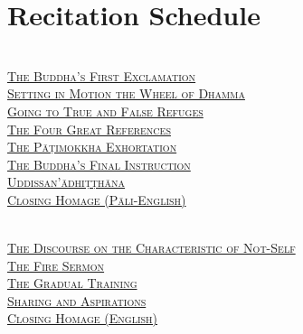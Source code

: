\chapter{Recitation Schedule}
\label{schedule}

{\centering

  {\libertinusFont\selectfont\textbf{\textsc{\ifafiveversion\fontsize{18}{12}\fi\ifasixversion\fontsize{13}{8.5}\fi\selectfont{}}}}\\

  \textsc{\ifafiveversion\fontsize{14.4}{28}\fi\ifasixversion\fontsize{10}{20}\fi\selectfont
    \hyperref[buddhas-first-exclamation]{The Buddha's First Exclamation} \ifdigitalversion\else\pageref{buddhas-first-exclamation}\fi\\
    \hyperref[wheel-of-dhamma-abridged]{Setting in Motion the Wheel of Dhamma} \ifdigitalversion\else\pageref{wheel-of-dhamma-abridged}\fi\\
    \hyperref[true-false-refuges]{Going to True and False Refuges} \ifdigitalversion\else\pageref{true-false-refuges}\fi\\
    \hyperref[four-great-references]{The Four Great References} \ifdigitalversion\else\pageref{four-great-references}\fi\\
    \hyperref[patimokkha-exhortation]{The Pāṭimokkha Exhortation} \ifdigitalversion\else\pageref{patimokkha-exhortation}\fi\\
    \hyperref[buddhas-final-instruction]{The Buddha's Final Instruction} \ifdigitalversion\else\pageref{buddhas-final-instruction}\fi\\
    \hyperref[uddissanadhitthana]{Uddissan'ādhiṭṭhāna} \ifdigitalversion\else\pageref{uddissanadhitthana}\fi\\
    \hyperref[closing-homage]{Closing Homage (Pāli-English)} \ifdigitalversion\else\pageref{closing-homage}\fi\\
  }

  \vspace{1.0cm}

  {\libertinusFont\selectfont\textbf{\textsc{\ifafiveversion\fontsize{18}{12}\fi\ifasixversion\fontsize{13}{8.5}\fi\selectfont{}}}}\\

  \textsc{\ifafiveversion\fontsize{14.4}{28}\fi\ifasixversion\fontsize{10}{20}\fi\selectfont
    \hyperref[characteristic-of-not-self]{The Discourse on the Characteristic of Not-Self} \ifdigitalversion\else\pageref{characteristic-of-not-self}\fi\\
    \hyperref[fire-sermon]{The Fire Sermon} \ifdigitalversion\else\pageref{fire-sermon}\fi\\
    \hyperref[gradual-training]{The Gradual Training} \ifdigitalversion\else\pageref{gradual-training}\fi\\
    \hyperref[sharing-aspirations]{Sharing and Aspirations} \ifdigitalversion\else\pageref{sharing-aspirations}\fi\\
    \hyperref[closing-homage]{Closing Homage (English)} \ifdigitalversion\else\pageref{closing-homage}\fi\\
  }

}
